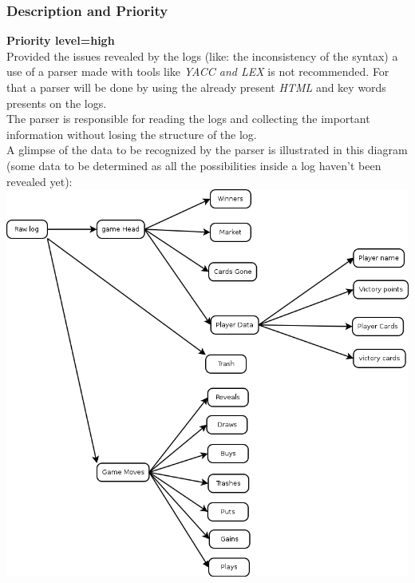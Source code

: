 \documentclass{scrreprt}
\begin{document}
\subsubsection{Description and Priority}

\textbf{Priority level=high}\\

Provided the issues revealed by the logs (like: the inconsistency of the syntax)
a use of a parser made with tools like \textit{YACC and LEX} is not recommended.
For that a parser will be done by using the already present \textit{HTML} and
key words presents on the logs.\\
The parser is responsible for reading the logs and collecting the important
information without losing the structure of the log.\\
A glimpse of the data to be recognized by the parser is illustrated in this
diagram (some data to be determined as all the possibilities inside a log
haven't been revealed yet):\\
\includegraphics[scale=0.35,keepaspectratio]{UseCaseParser}
\end{document}
